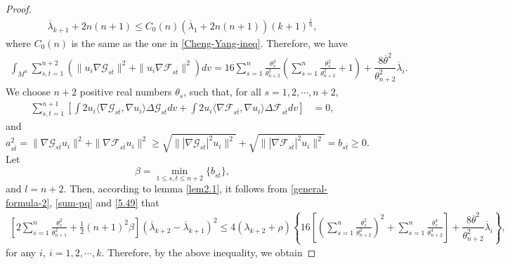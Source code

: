 \documentclass[12pt]{article}
\numberwithin{equation}{section}
\begin{document}
\begin{proof}
\begin{equation}\begin{aligned}\label{cy-upper-1}
\overline{\lambda}_{k+1}+2n(n+1)\leq C_{0}(n)(\overline{\lambda}_{1}+2n(n+1))(k+1)^{\frac{1}{n}},
\end{aligned}\end{equation} where $C_{0}(n)$ is the same as the one in \eqref{Cheng-Yang-ineq}.
Therefore, we have
\begin{equation}\begin{aligned}\label{sum-pq}
\int_{M^{n}}\sum^{n+2}_{s,t=1}\left(\|u_{i}\nabla \mathcal{G}_{s\overline{t}}\|^{2}+\|u_{i}\nabla \mathcal{F}_{s\overline{t}}\|^{2}\right)dv
=16\sum^{n}_{s=1}\frac{\theta_{s}^{2}}{\theta_{n+2}^{2}}\left(\sum^{n}_{s=1}\frac{\theta_{s}^{2}}{\theta_{n+2}^{2}} + 1\right)+\dfrac{8\overline{\theta}^{2}}{\theta^{2}_{n+2}}\overline{\lambda}_{i}.
\end{aligned}\end{equation}  We choose $n+2$ positive real numbers $\theta_{s}$, such that, for all $s=1,2,\cdots,n+2$,
\begin{equation}\begin{aligned}\label{5.49} \sum_{s,t=1}^{n+1}\left[\int2 u_{i}\langle\nabla \mathcal{G}_{s\overline{t}},\nabla u_{i}\rangle\Delta  \mathcal{G}_{s\overline{t}}
dv+\int2 u_{i}\langle\nabla \mathcal{F}_{s\overline{t}},\nabla u_{i}\rangle\Delta  \mathcal{F}_{s\overline{t}}
dv\right]&=0,\end{aligned}\end{equation} and
\begin{equation*}a_{s\overline{t}}^{2}=\|\nabla \mathcal{G}_{s\overline{t}}u_{i}\|^{2}+\|\nabla \mathcal{F}_{s\overline{t}}u_{i}\|^{2}
\geq\sqrt{\||\nabla \mathcal{G}_{s\overline{t}}|^{2}u_{i}\|^{2}}+\sqrt{\||\nabla \mathcal{F}_{s\overline{t}}|^{2}u_{i}\|^{2}}=b_{s\overline{t}}\geq0.\end{equation*}
Let $$\beta=\min_{1\leq s,t\leq n+2}\{b_{s\overline{t}}\},$$
and $l=n+2$. Then, according to lemma \ref{lem2.1}, it follows from
\eqref{general-formula-2}, \eqref{sum-pq} and \eqref{5.49} that
\begin{equation*}\begin{aligned}\left[2\sum^{n}_{s=1}\frac{\theta_{s}^{2}}{\theta_{n+1}^{2}}+\frac{1}{2}(n+1)^{2}\beta\right]\left(\overline{\lambda}_{k+2}-\overline{\lambda}_{k+1}\right)^{2}
\leq4(\lambda_{k+2}+\rho)\left\{16\left[\left(\sum^{n}_{s=1}\frac{\theta_{s}^{2}}{\theta_{n+2}^{2}}\right)^{2}+\sum^{n}_{s=1}\frac{\theta_{s}^{4}}{\theta_{n+2}^{4}}\right]
+\dfrac{8\overline{\theta}^{2}}{\theta^{2}_{n+2}}\overline{\lambda}_{i}\right\},
\end{aligned}\end{equation*}for any $i,~i=1,2,\cdots,k$. Therefore, by the above inequality, we obtain


\end{proof}
\end{document}

